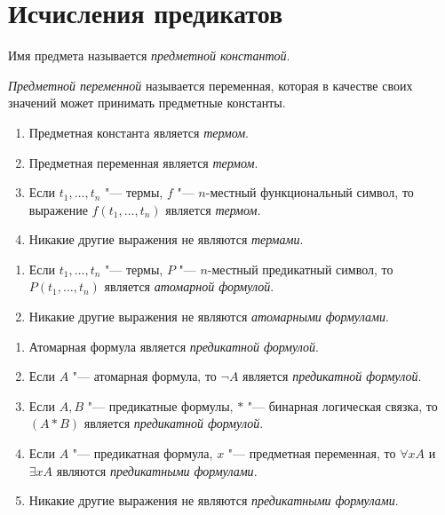 \section{Исчисления предикатов}

\begin{definition}
	Имя предмета называется \emph{предметной константой}.
\end{definition}

\begin{definition}
	\emph{Предметной переменной} называется переменная, которая в качестве своих значений может принимать предметные константы.
\end{definition}

\begin{definition}
	\hfill
	\begin{enumerate}
		\item Предметная константа является \emph{термом}.
		\item Предметная переменная является \emph{термом}.
		\item Если $ t_1, \dots, t_n $ "--- термы, $ f $ "--- $ n $-местный функциональный символ, то выражение $ f(t_1, \dots, t_n) $ является \emph{термом.}
		\item Никакие другие выражения не являются \emph{термами}.
	\end{enumerate}
\end{definition}

\begin{definition}
	\hfill
	\begin{enumerate}
		\item Если $ t_1, \dots, t_n $ "--- термы, $ P $ "--- $ n $-местный предикатный символ, то $ P(t_1, \dots, t_n) $ является \emph{атомарной формулой}.
		\item Никакие другие выражения не являются \emph{атомарными формулами}.
	\end{enumerate}
\end{definition}

\begin{definition}
	\hfill
	\begin{enumerate}
		\item Атомарная формула является \emph{предикатной формулой}.
		\item Если $ A $ "--- атомарная формула, то $ \neg A $ является \emph{предикатной формулой}.
		\item Если $ A, B $ "--- предикатные формулы, $ * $ "--- бинарная логическая связка, то $ (A * B) $ является \emph{предикатной формулой}.
		\item Если $ A $ "--- предикатная формула, $ x $ "--- предметная переменная, то $ \forall x A $ и $ \exists x A $ являются \emph{предикатными формулами}.
		\item Никакие другие выражения не являются \emph{предикатными формулами}.
	\end{enumerate}
\end{definition}


